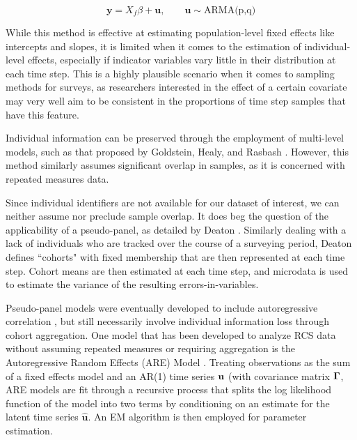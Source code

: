 $$ {\mathbf{y}} = X_f\beta + \mathbf{u}, \qquad \mathbf{u}\sim\text{ARMA(p,q)} $$

  While this method is effective at estimating population-level 
  fixed effects like intercepts and slopes, it is limited when 
  it comes to the estimation of individual-level effects, 
  especially if indicator variables vary little in their 
  distribution at each time step. This is a highly plausible
   scenario when it comes to sampling methods for surveys, as 
   researchers interested in the effect of a certain covariate 
   may very well aim to be consistent in the proportions of time 
   step samples that have this feature.

   Individual information can be preserved through the employment of multi-level models, 
   such as that proposed by Goldstein, Healy, and Rasbash \cite{goldstein1994multilevel}.
   However, this method similarly assumes significant overlap in samples, as it is concerned
   with repeated measures data. 




  
  





Since individual identifiers are not available for our dataset of interest, we can neither 
assume nor preclude sample overlap. It does beg the question of the applicability of a
pseudo-panel, as detailed by Deaton \cite{deaton1985panel}. Similarly dealing with a lack
of individuals who are tracked over the course of a surveying period, Deaton defines ``cohorts"
with fixed membership that are then represented at each time step. Cohort means are then 
estimated at each time step, and microdata is used to estimate the variance of the resulting
errors-in-variables.

Pseudo-panel models were eventually developed to include autoregressive correlation \cite{collado1997estimating},
but still necessarily involve individual information loss through cohort aggregation. 
One model that has been developed to analyze RCS data without assuming repeated measures or requiring aggregation
 is the Autoregressive Random Effects 
(ARE) Model \citep{modugno2015multilevel}. Treating observations 
as the sum of a fixed effects model and an AR(1) time series $\mathbf{u}$ (with covariance matrix $\mathbf{\Gamma}$,
ARE models are fit through a recursive process
 that splits the log likelihood function of the model into two 
 terms by conditioning on an estimate for the latent time series $\hat{\mathbf{u}}$. An EM algorithm is then employed for parameter estimation.
 



